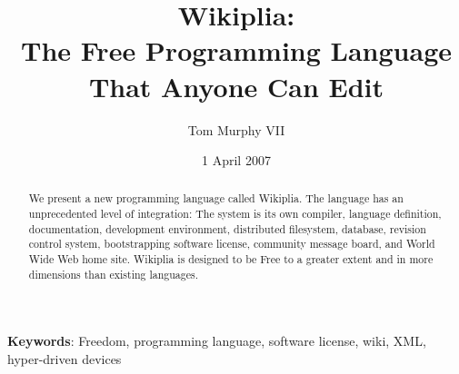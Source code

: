 \documentclass[twocolumn]{article}
\begin{document}
\newcommand\currentrevision{465}

\newcommand\ftinker{\ensuremath{\copyright}}
\newcommand\fexpression{\ensuremath{\hbar}}
\newcommand\fbeer{\ensuremath{\triangle}}
\newcommand\fusa{\ensuremath{\sqrt[x^{1.2}]{\mbox{\t{oo}} + \frac{x}{z^2}}}}
\newcommand\ffree{\ensuremath{\P}}

\newcommand\wcite[1]{\footnote{\tiny Wikipedia, the free encyclopedia: {\it #1}; 2007}}
\newcommand\comment[1]{}
\newcommand\z{\ensuremath{\!}}

\newcommand\D\Delta
\newcommand\G\Gamma
\newcommand\m\mapsto
\newcommand\eval{{\sf eval\,\,}}
\newcommand\tag[2]{{\tt{\mbox{\tt <}}{#1}{\mbox{\tt>}}}{#2}{\tt{\mbox{\tt</}}{#1}{\mbox{\tt>}}}}
\newcommand\prim{{\,\,\sf prim}}
\newcommand\rate{{\sf rate\,\,}}

\newcommand\lb{\ensuremath{[\![}}
\newcommand\rb{\ensuremath{]\!]}}

\title{{\bf \huge Wikiplia}:\\
       The Free Programming Language\\
       That Anyone Can Edit}

\author{Tom Murphy VII}
\date{1 April 2007}

\maketitle

\begin{abstract}
We present a new programming language called Wikiplia. The language
has an unprecedented level of integration: The system is its own
compiler, language definition, documentation, development environment,
distributed filesystem, database, revision control system,
bootstrapping software license, community message board, and World
Wide Web home site. Wikiplia is designed to be Free to a greater
extent and in more dimensions than existing languages.
\end{abstract}


\vspace{1em}
{\noindent \small {\bf Keywords}:
  Freedom, programming language, software license, wiki, XML, 
  hyper-driven devices
}
\end{document}
